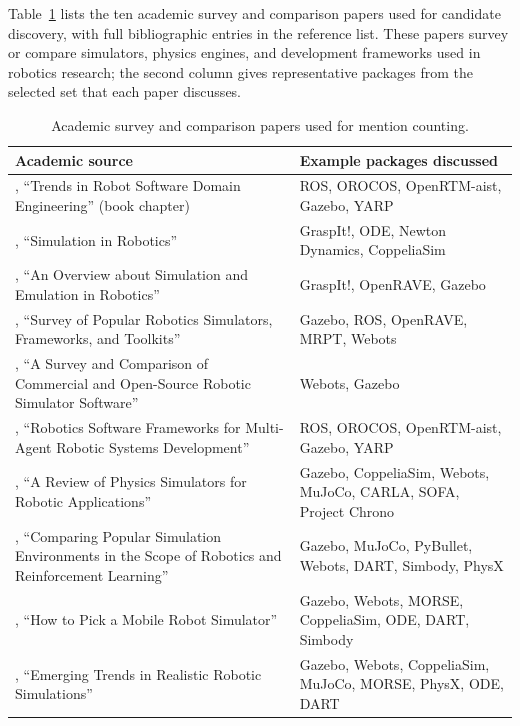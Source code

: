 Table~\ref{tab:academic-mention-sources} lists the ten academic survey and comparison papers used for candidate discovery, with full bibliographic entries in the reference list. These papers survey or compare simulators, physics engines, and development frameworks used in robotics research; the second column gives representative packages from the selected set that each paper discusses.

\begin{table}[htbp]
\centering
\caption{Academic survey and comparison papers used for mention counting.}
\label{tab:academic-mention-sources}
\small
\singlespacing
\begin{tabular}{@{}p{8.6cm}p{4.2cm}@{}}
\toprule
\textbf{Academic source} & \textbf{Example packages discussed} \\
\midrule
\citet{Brugali2007}, ``Trends in Robot Software Domain Engineering'' (book chapter) & ROS, OROCOS, OpenRTM-aist, Gazebo, YARP \\
\citet{Zlajpah2008}, ``Simulation in Robotics'' & GraspIt!, ODE, Newton Dynamics, CoppeliaSim \\
\citet{Reckhaus2010}, ``An Overview about Simulation and Emulation in Robotics'' & GraspIt!, OpenRAVE, Gazebo \\
\citet{Harris2011}, ``Survey of Popular Robotics Simulators, Frameworks, and Toolkits'' & Gazebo, ROS, OpenRAVE, MRPT, Webots \\
\citet{Staranowicz2011}, ``A Survey and Comparison of Commercial and Open-Source Robotic Simulator Software'' & Webots, Gazebo \\
\citet{InigoBlasco2012}, ``Robotics Software Frameworks for Multi-Agent Robotic Systems Development'' & ROS, OROCOS, OpenRTM-aist, Gazebo, YARP \\
\citet{collins2021simulators}, ``A Review of Physics Simulators for Robotic Applications'' & Gazebo, CoppeliaSim, Webots, MuJoCo, CARLA, SOFA, Project Chrono \\
\citet{Korber2021}, ``Comparing Popular Simulation Environments in the Scope of Robotics and Reinforcement Learning'' & Gazebo, MuJoCo, PyBullet, Webots, DART, Simbody, PhysX \\
\citet{Farley2022}, ``How to Pick a Mobile Robot Simulator'' & Gazebo, Webots, MORSE, CoppeliaSim, ODE, DART, Simbody \\
\citet{Kargar2024}, ``Emerging Trends in Realistic Robotic Simulations'' & Gazebo, Webots, CoppeliaSim, MuJoCo, MORSE, PhysX, ODE, DART \\
\bottomrule
\end{tabular}
\end{table}

